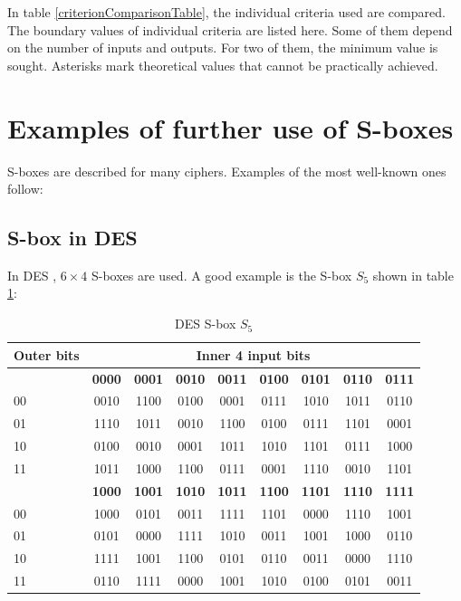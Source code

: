 \bigskip
In table \ref{criterionComparisonTable}, the individual criteria used are compared. The boundary
values of individual criteria are listed here. Some of them depend on the number of inputs and outputs.
For two of them, the minimum value is sought.
Asterisks mark theoretical values that
cannot be practically achieved.

\pagebreak %
\section{Examples of further use of S-boxes}\label{secSboxUsing}
S-boxes are described for many ciphers.
Examples of the most well-known ones follow:
\subsection{S-box in DES}
In DES \cite{wikiSbox}, $6 \times 4$ S-boxes are used.
A good example is the S-box $S_5$ shown in table \ref{desSbox}:
\begin{table}[pt]
\begin{center}
  \begin{tabular}{| l | c | c | c | c |  c | c | c | c |}
  \hline
Outer bits	& \multicolumn{8}{|c|}{Inner 4 input bits} \\ \hline
~  & \bf 0000 & \bf 0001 & \bf 0010 & \bf 0011 & \bf 0100 & \bf 0101 & \bf 0110 & \bf 0111 \\ \hline
00 & 0010 & 1100 & 0100 & 0001 & 0111 & 1010 & 1011 & 0110 \\ \hline
01 & 1110 & 1011 & 0010 & 1100 & 0100 & 0111 & 1101 & 0001 \\ \hline
10 & 0100 & 0010 & 0001 & 1011 & 1010 & 1101 & 0111 & 1000 \\ \hline
11 & 1011 & 1000 & 1100 & 0111 & 0001 & 1110 & 0010 & 1101 \\ \hline
  \hline
~  & \bf 1000 & \bf 1001 & \bf 1010 & \bf 1011 & \bf 1100 & \bf 1101 & \bf 1110 & \bf 1111 \\ \hline
00 & 1000 & 0101 & 0011 & 1111 & 1101 & 0000 & 1110 & 1001 \\ \hline
01 & 0101 & 0000 & 1111 & 1010 & 0011 & 1001 & 1000 & 0110 \\ \hline
10 & 1111 & 1001 & 1100 & 0101 & 0110 & 0011 & 0000 & 1110 \\ \hline
11 & 0110 & 1111 & 0000 & 1001 & 1010 & 0100 & 0101 & 0011 \\ \hline
  \end{tabular}
  \caption{DES S-box $S_5$}
  \label{desSbox}
\end{center}
\end{table}
